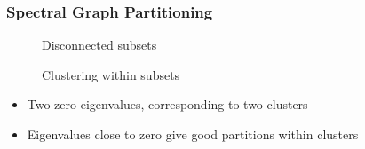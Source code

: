 \documentclass[9pt]{beamer}
\begin{document}
\begin{frame}
\frametitle{Spectral Graph Partitioning}
\label{sec-3-7}

\vspace*{-0.0cm}\begin{figure}
      \caption{Disconnected subsets}
\end{figure}
\vspace*{-0.0cm}\begin{figure}
      \caption{Clustering within subsets}
\end{figure}
\begin{itemize}
\item Two zero eigenvalues, corresponding to two clusters
\item Eigenvalues close to zero give good partitions within clusters
\end{itemize}
\end{frame}
\end{document}
